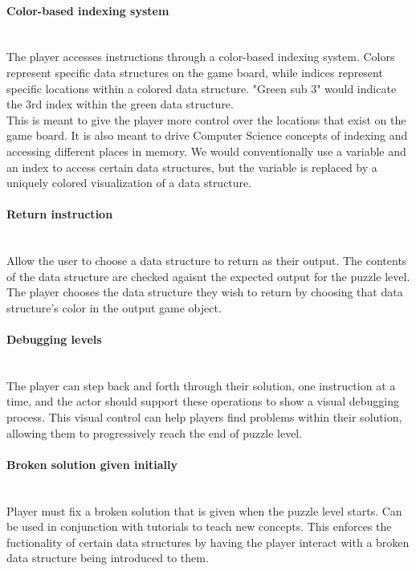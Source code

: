 \paragraph{Color-based indexing system}\mbox{} \\
The player accesses instructions through a color-based indexing system.
Colors represent specific data structures on the game board, while indices represent
specific locations within a colored data structure. "Green sub 3" would indicate the
3rd index within the green data structure.\\

This is meant to give the player more control over the locations that exist on the
game board. It is also meant to drive Computer Science concepts of indexing and accessing
different places in memory. We would conventionally use a variable and an index to access
certain data structures, but the variable is replaced by a uniquely colored visualization
of a data structure.\\

\paragraph{Return instruction}\mbox{} \\
Allow the user to choose a data structure to return as their output. The
contents of the data structure are checked agaisnt the expected output for the
puzzle level. The player chooses the data structure they wish to return by choosing
that data structure's color in the output game object.\\

\paragraph{Debugging levels}\mbox{} \\
The player can step back and forth through their solution, one instruction at a time,
and the actor should support these operations to show a visual debugging process. This
visual control can help players find problems within their solution, allowing them to
progressively reach the end of puzzle level.\\

\paragraph{Broken solution given initially}\mbox{} \\
Player must fix a broken solution that is given when the puzzle level starts.
Can be used in conjunction with tutorials to teach new concepts. This enforces the fuctionality
of certain data structures by having the player interact with a broken data structure being
introduced to them.\\

